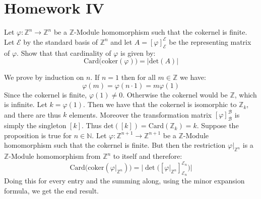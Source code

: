 \documentclass[crop=false,class=article]{standalone}                           %
\begin{document}
    \section{Homework IV}
        \begin{problem}
            Let $\varphi:\mathbb{Z}^{n}\rightarrow\mathbb{Z}^{n}$ be a
            $\mathbb{Z}\textrm{-Module}$ homomorphism such that the cokernel is
            finite. Let $\mathscr{E}$ by the standard basis of $\mathbb{Z}^{n}$
            and let $A=[\varphi]_{\mathscr{E}}^{\mathscr{E}}$ be the
            representing matrix of $\varphi$. Show that that cardinality of
            $\varphi$ is given by:
            \begin{equation}
                \textrm{Card}\big(\textrm{coker}(\varphi)\big)=|\textrm{det}(A)|
            \end{equation}
        \end{problem}
        \begin{solution}
            We prove by induction on $n$. If $n=1$ then for all $m\in\mathbb{Z}$
            we have:
            \begin{equation}
                \varphi(m)=\varphi(n\cdot{1})=m\varphi(1)
            \end{equation}
            Since the cokernel is finite, $\varphi(1)\ne{0}$. Otherwise the
            cokernel would be $\mathbb{Z}$, which is infinite. Let
            $k=\varphi(1)$. Then we have that the cokernel is isomorphic to
            $\mathbb{Z}_{k}$, and there are thus $k$ elements. Moreover the
            transformation matrix $[\varphi]_{\mathscr{B}}^{\mathscr{B}}$ is
            simply the singleton $[k]$. Thus
            $\textrm{det}([k])=\textrm{Card}(\mathbb{Z}_{k})=k$. Suppose the
            proposition is true for $n\in\mathbb{N}$. Let
            $\varphi:\mathbb{Z}^{n+1}\rightarrow\mathbb{Z}^{n+1}$ be a
            $\mathbb{Z}\textrm{-Module}$ homomorphism such that the cokernel is
            finite. But then the restriction $\varphi|_{\mathbb{Z}^{n}}$ is a
            $\mathbb{Z}\textrm{-Module}$ homomorphism from $\mathbb{Z}^{n}$ to
            itself and therefore:
            \begin{equation}
                \textrm{Card}\big(\textrm{coker}(\varphi|_{\mathbb{Z}^{n}})\big)
                =\big|\det\big([\varphi|_{\mathbb{Z}^{n}}
                    ]_{\mathscr{E}_{n}}^{\mathscr{E}_{n}}\big)\big|
            \end{equation}
            Doing this for every entry and the summing along, using the minor
            expansion formula, we get the end result.
        \end{solution}
\end{document}
